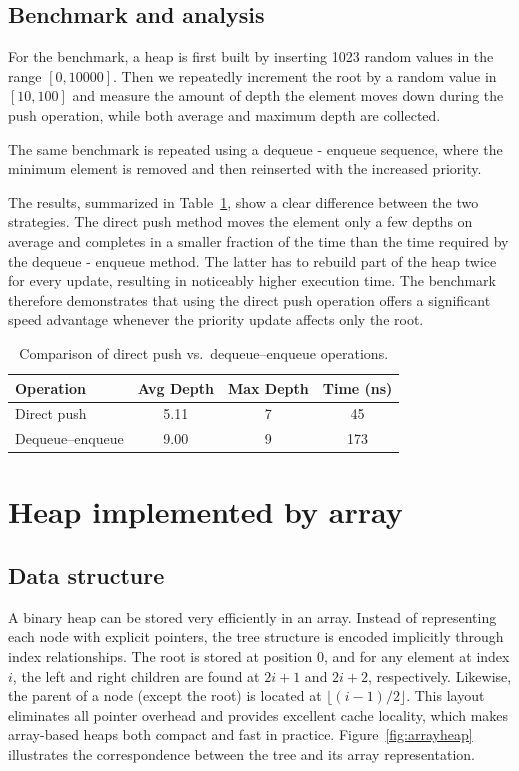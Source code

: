 \documentclass[a4paper,11pt]{article}
\begin{document}
\subsection*{Benchmark and analysis}

For the benchmark, a heap is first built by inserting 1023 random values in the range $[0,10000]$. Then we repeatedly increment the root by a random value in $[10,100]$ and measure the amount of depth the element moves down during the push operation, while both average and maximum depth are collected.

The same benchmark is repeated using a dequeue - enqueue sequence, where the minimum element is removed and then reinserted with the increased priority.

The results, summarized in Table~\ref{tab:push-vs-deqenq}, show a clear difference between the two strategies. The direct push method moves the element only a few depths on average and completes in a smaller fraction of the time than the time required by the dequeue - enqueue method. The latter has to rebuild part of the heap twice for every update, resulting in noticeably higher execution time. The benchmark therefore demonstrates that using the direct push operation offers a significant speed advantage whenever the priority update affects only the root.

\begin{table}[h]
\centering
\begin{tabular}{l|ccc}
\textbf{Operation} & \textbf{Avg Depth} & \textbf{Max Depth} & \textbf{Time (ns)} \\
\hline
Direct push        & 5.11 & 7 & 45 \\
Dequeue--enqueue   & 9.00 & 9 & 173 \\
\end{tabular}
\caption{Comparison of direct push vs.\ dequeue--enqueue operations.}
\label{tab:push-vs-deqenq}
\end{table}

\section*{Heap implemented by array}

\subsection*{Data structure}
A binary heap can be stored very efficiently in an array. Instead of representing each node with explicit pointers, the tree structure is encoded implicitly through index relationships. The root is stored at position $0$, and for any element at index $i$, the left and right children are found at $2i+1$ and $2i+2$, respectively. Likewise, the parent of a node (except the root) is located at $\lfloor (i-1)/2 \rfloor$. This layout eliminates all pointer overhead and provides excellent cache locality, which makes array-based heaps both compact and fast in practice. Figure~\ref{fig:arrayheap} illustrates the correspondence between the tree and its array representation.
\end{document}
